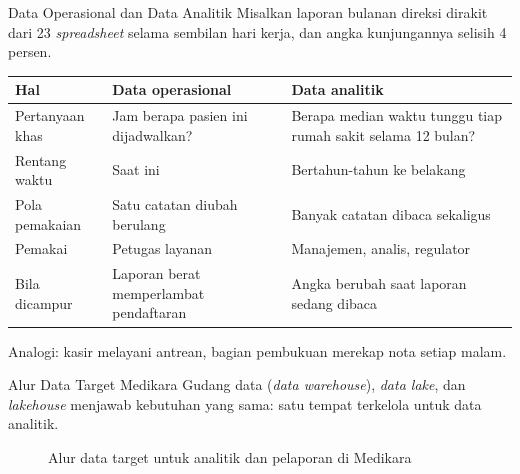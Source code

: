 \documentclass[aspectratio=169, table, 12pt]{beamer}
\begin{document}
\begin{frame}{{\Large Data Operasional dan Data Analitik}}
  \small Misalkan laporan bulanan direksi dirakit dari 23 \textit{spreadsheet} selama sembilan hari
  kerja, dan angka kunjungannya selisih 4 persen.

  \vspace{4pt}
  \footnotesize
  \begin{tabularx}{\textwidth}{L{2.6cm}YY}
    \hline
    \textbf{Hal} & \textbf{Data operasional} & \textbf{Data analitik} \\
    \hline
    Pertanyaan khas & Jam berapa pasien ini dijadwalkan? & Berapa median waktu tunggu tiap rumah sakit selama 12 bulan? \\
    \hline
    Rentang waktu & Saat ini & Bertahun-tahun ke belakang \\
    \hline
    Pola pemakaian & Satu catatan diubah berulang & Banyak catatan dibaca sekaligus \\
    \hline
    Pemakai & Petugas layanan & Manajemen, analis, regulator \\
    \hline
    Bila dicampur & Laporan berat memperlambat pendaftaran & Angka berubah saat laporan sedang dibaca \\
    \hline
  \end{tabularx}

  \vspace{4pt}
  \small Analogi: kasir melayani antrean, bagian pembukuan merekap nota setiap malam.
\end{frame}

\begin{frame}{{\Large Alur Data Target Medikara}}
  \small Gudang data (\textit{data warehouse}), \textit{data lake}, dan \textit{lakehouse} menjawab
  kebutuhan yang sama: satu tempat terkelola untuk data analitik.

  \centering
  \begin{figure}
    \resizebox{0.78\textwidth}{!}{}
    \caption{Alur data target untuk analitik dan pelaporan di Medikara}
  \end{figure}
\end{frame}
\end{document}

